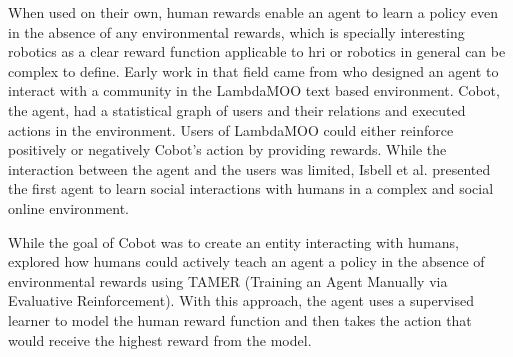 When used on their own, human rewards enable an agent to learn a policy even in the absence of any environmental rewards, which is specially interesting robotics as a clear reward function applicable to \gls{hri} or robotics in general can be complex to define. Early work in that field came from \cite{isbell2006cobot} who designed an agent to interact with a community in the LambdaMOO text based environment. Cobot, the agent, had a statistical graph of users and their relations and executed actions in the environment. Users of LambdaMOO could either reinforce positively or negatively Cobot's action by providing rewards. While the interaction between the agent and the users was limited, Isbell et al. presented the first agent to learn social interactions with humans in a complex and social online environment. 

While the goal of Cobot was to create an entity interacting with humans, \cite{knox2009interactively} explored how humans could actively teach an agent a policy in the absence of environmental rewards using TAMER (Training an Agent Manually via Evaluative Reinforcement). With this approach, the agent uses a supervised learner to model the human reward function and then takes the action that would receive the highest reward from the model. 

